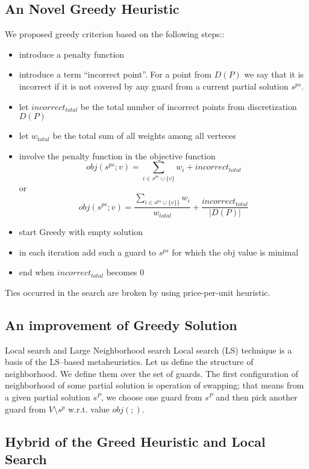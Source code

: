 \documentclass[runningheads,a4paper]{llncs}
\begin{document}
        \subsection{An Novel Greedy Heuristic}
          We proposed greedy criterion based on the following steps::
           \begin{itemize}
			\item introduce a penalty function
          	\item introduce a term ``incorrect point''. For a point from $D(P)$ we say that it is incorrect if it is not covered by any guard from a current partial solution $s^{ps}$.
			\item let $incorrect_{total}$ be the total number of incorrect points from discretization $D(P)$
			\item let $w_{total}$ be the total sum of all weights among all verteces
			\item involve the penalty function in the objective function
				$$obj(s^{ps}; v)  = \sum_{i \in s^{ps} \cup \{v\}} w_i+ incorrect_{total}$$ or
				$$obj(s^{ps}; v) = \frac{\sum_{i \in s^{ps} \cup \{v\}\}} w_i}{w_{total}}+ \frac{incorrect_{total}}{|D(P)|}$$
			\item start Greedy with empty solution
			\item in each iteration add such a guard to $s^{ps}$ for which the obj value is minimal
			\item end when $incorrect_{total}$ becomes 0
          \end{itemize}
      Ties occurred in the search are broken by using  price-per-unit heuristic.
      \subsection{An improvement of Greedy Solution}
      Local search and Large Neighborhood search 
      Local search (LS) technique is a basis of the LS--based metaheuristics. Let us define the structure of neighborhood. We define them over the set of guards.
      The first configuration of neighborhood of some partial solution is operation of swapping; that means from a given partial solution $s^P$, we choose one guard from $s^P$ and then pick another guard from $V \setminus s^p$ w.r.t. value $obj(;)$.

      \subsection{Hybrid of the Greed Heuristic and Local Search}
\end{document}

